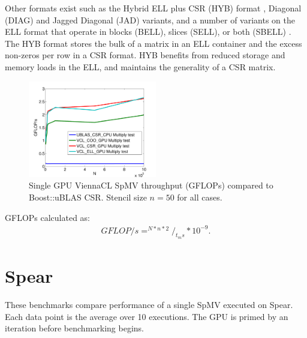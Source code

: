 \documentclass{report}
\begin{document}
Other formats exist such as the Hybrid ELL plus CSR (HYB) format \cite{Bell2009}, Diagonal (DIAG) and Jagged Diagonal (JAD) variants, and a number of variants on the ELL format that operate in blocks (BELL), slices (SELL), or both (SBELL) \cite{SuKeutzer2012}. The HYB format stores the bulk of a matrix in an ELL container and the excess non-zeros per row in a CSR format. HYB benefits from reduced storage and memory loads in the ELL, and maintains the generality of a CSR matrix. 

\begin{figure}
\centering
\includegraphics[width=0.5\textwidth]{../figures/spmv/spmv_vcl_gflops-eps-converted-to.pdf}
\caption{Single GPU ViennaCL SpMV throughput (GFLOPs) compared to Boost::uBLAS CSR. Stencil size $n=50$ for all cases.}
\label{fig:spmv_vcl_gflops}
\end{figure}

GFLOPs calculated as: 
\begin{align}
GFLOP/s = ^{N * n * 2} /_{t_ms} * 10^{-9}. 
\end{align}


\section{Spear}

These benchmarks compare performance of a single SpMV executed on Spear. Each data point is the average over 10 executions. The GPU is primed by an iteration before benchmarking begins. 
\end{document}

